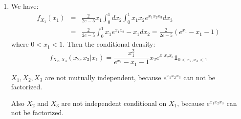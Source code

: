 \documentclass[12pt]{article}
\begin{document}
\begin{enumerate}
    \item
    We have:
    \begin{eqnarray}
        f_{X_1}(x_1) &=& \frac{2}{2e-5} x_1 \int_0^1 dx_2\int_0^1 x_1 x_2 e^{x_1 x_2 x_3}dx_3 \\
                     &=& \frac{2}{2e-5} \int_0^1 x_1 e^{x_1 x_2} - x_1 dx_2 = \frac{2}{2e-5} (e^{x_1} - x_1 -1)         
    \end{eqnarray}
    where $0< x_1 <1$.
    Then the conditional density:
    $$f_{X_2,X_3}(x_2,x_3 | x_1) = \frac{x_1^2}{e^{x_1}-x_1-1} x_2 e^{x_1 x_2 x_3} \bm{1}_{0<x_2,x_3<1}$$

    $X_1,X_2,X_3$ are not mutually independent, because $e^{x_1 x_2 x_3}$ can not be factorized.

    Also $X_2$ and $X_3$ are not independent conditional on $X_1$, because $e^{x_1 x_2 x_3}$ can not be factorized.

\end{enumerate}
\end{document}
